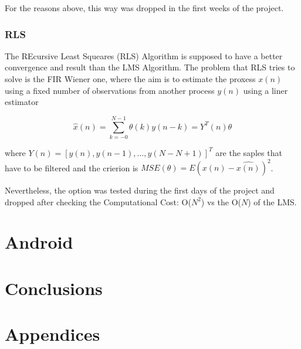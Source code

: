 \documentclass[11pt,a4paper,spanish]{book}  %
\theoremstyle{definition}  %
\theoremstyle{plain}  %
\theoremstyle{remark}  %
\begin{document}
	For the reasons above, this way was dropped in the first weeks of the project.
	
	\subsection{RLS}
	
	The REcursive Least Squeares (RLS) Algorithm \cite{asp} is supposed to have a better convergence and result than the LMS Algorithm. The problem that RLS tries to solve is the FIR Wiener one, where the aim is to estimate the proxess $x(n)$ using a fixed number of observations from another process ${y(n)}$ using a liner estimator
	
	\begin{equation}
	\hat{x}(n)=\sum \limits_{k=-0}^{N-1} \theta(k)y(n-k)=Y^T (n)\theta
	\end{equation}
	
	where $Y(n)= [y(n),y(n-1),\dots,y(N-N+1)]^T$ are the saples that have to be filtered and the crierion is $MSE(\theta)=E{(x(n)-\hat{x(n)})^2}$.
	
	Nevertheless, the option was tested during the first days of the project and dropped after checking the Computational Cost: O($N^2$) vs the  O($N$) of the LMS.



\chapter{Android}

\chapter{Conclusions}

\chapter{Appendices}
\label{sec:appendix}







\end{document}
